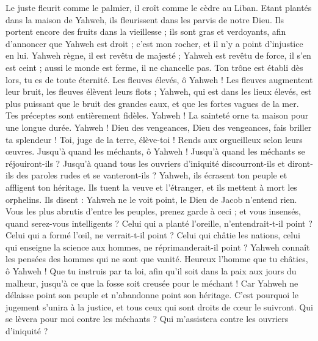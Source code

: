 \begin{multicols}{2}
Le juste fleurit comme le palmier, il croît comme le cèdre au Liban.
Etant plantés dans la maison de Yahweh, ils fleurissent dans les parvis de notre Dieu.
Ils portent encore des fruits dans la vieillesse ; ils sont gras et verdoyants,
afin d'annoncer que Yahweh est droit ; c’est mon rocher, et il n'y a point d'injustice en lui.
\VerseOne{}Yahweh règne, il est revêtu de majesté ; Yahweh est revêtu de force, il s'en est ceint ; aussi le monde est ferme, il ne chancelle pas.
Ton trône est établi dès lors, tu es de toute éternité.
Les fleuves élevés, ô Yahweh ! Les fleuves augmentent leur bruit, les fleuves élèvent leurs flots ;
Yahweh, qui est dans les lieux élevés, est plus puissant que le bruit des grandes eaux, et que les fortes vagues de la mer.
Tes préceptes sont entièrement fidèles. Yahweh ! La sainteté orne ta maison pour une longue durée.
\VerseOne{}Yahweh ! Dieu des vengeances, Dieu des vengeances, fais briller ta splendeur !
Toi, juge de la terre, élève-toi ! Rends aux orgueilleux selon leurs œuvres.
Jusqu’à quand les méchants, ô Yahweh ! Jusqu’à quand les méchants se réjouiront-ils ?
Jusqu’à quand tous les ouvriers d'iniquité discourront-ils et diront-ils des paroles rudes et se vanteront-ils ?
Yahweh, ils écrasent ton peuple et affligent ton héritage.
Ils tuent la veuve et l'étranger, et ils mettent à mort les orphelins.
Ils disent : Yahweh ne le voit point, le Dieu de Jacob n’entend rien.
Vous les plus abrutis d'entre les peuples, prenez garde à ceci ; et vous insensés, quand serez-vous intelligents ?
Celui qui a planté l'oreille, n'entendrait-t-il point ? Celui qui a formé l'œil, ne verrait-t-il point ?
Celui qui châtie les nations, celui qui enseigne la science aux hommes, ne réprimanderait-il point ?
Yahweh connaît les pensées des hommes qui ne sont que vanité.
Heureux l'homme que tu châties, ô Yahweh ! Que tu instruis par ta loi,
afin qu’il soit dans la paix aux jours du malheur, jusqu’à ce que la fosse soit creusée pour le méchant !
Car Yahweh ne délaisse point son peuple et n'abandonne point son héritage.
C'est pourquoi le jugement s'unira à la justice, et tous ceux qui sont droits de cœur le suivront.
Qui se lèvera pour moi contre les méchants ? Qui m'assistera contre les ouvriers d'iniquité ?

\end{multicols}
